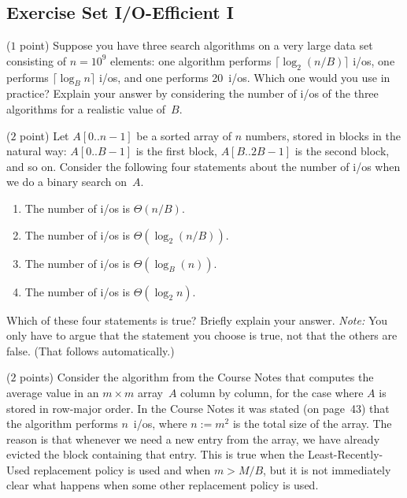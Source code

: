\documentclass{article}
\newcommand{\io}{{\sc i/o}\xspace}
\newcommand{\ios}{{\io}s\xspace}
\newcounter{rcounter}
\newenvironment{rlist}%
{\begin{list}{\setnr-\arabic{rcounter}}{\usecounter{rcounter}}}{\end{list}}
\begin{document}
    \subsection*{Exercise Set I/O-Efficient I}
    \begin{rlist}
        
        \item ($1$ point)
        Suppose you have three search algorithms on a very large data set consisting of $n=10^9$ elements: 
        one algorithm performs $\lceil \log_2 (n/B)\rceil$ \ios, one performs $\lceil \log_B n \rceil$ \ios,
        and one performs 20~\ios.
        Which one would you use in practice? Explain your answer by considering the number of \ios 
        of the three algorithms for a realistic value of~$B$.
        
        \item ($2$ point)
        Let $A[0..n-1]$ be a sorted array of $n$ numbers, stored in blocks in the natural
        way: $A[0..B-1]$ is the first block, $A[B..2B-1]$ is the second block, and so on.
        Consider the following four statements about the number of \ios when we
        do a binary search on~$A$.
        \begin{enumerate}
            \item[(I)] The number of \ios is $\Theta(n/B)$.
            \item[(II)] The number of \ios is $\Theta(\log_2 (n/B))$.
            \item[(III)] The number of \ios is $\Theta(\log_B(n))$.
            \item[(IV)] The number of \ios is $\Theta(\log_2 n)$.
        \end{enumerate}
        Which of these four statements is true? Briefly explain your answer. 
        \emph{Note:} You only have to argue that the statement you choose is true, 
        not that the others are false. (That follows automatically.)
        
        
        \item ($2$ points)
        Consider the algorithm from the Course Notes that computes the average value in an $m\times m$ array~$A$
        column by column, for the case where $A$ is stored in row-major order.
        In the Course Notes it was stated (on page~43)
        that the algorithm performs $n$~\ios, where $n := m^2$ is the total size of the array.
        The reason is that whenever we need a new entry from
        the array, we have already evicted the block containing that entry. This
        is true when the Least-Recently-Used replacement policy is used and when $m > M/B$,
        but it is not immediately clear what happens when some other replacement policy is used.
        

\end{rlist}
\end{document}
